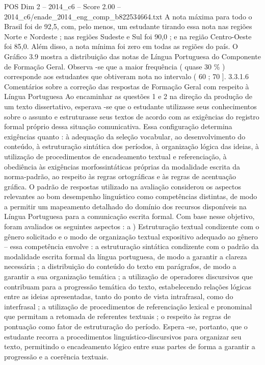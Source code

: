 \begin{textsample}{POS Dim 2 – 2014\_c6 – Score 2.00 – 2014\_c6/enade\_2014\_eng\_comp\_b822534664.txt}
A nota máxima para todo o Brasil foi de 92,5, com, pelo menos, um estudante tirando essa nota nas regiões Norte e Nordeste ; nas regiões Sudeste e Sul foi 90,0 ; e na região Centro-Oeste foi 85,0.
Além disso, a nota mínima foi zero em todas as regiões do país.
O Gráfico 3.9 mostra a distribuição das notas de Língua Portuguesa do Componente de Formação Geral.
Observa -se que a maior frequência ( quase 30 \% ) corresponde aos estudantes que obtiveram nota no intervalo ( 60 ; 70 ]. 3.3.1.6 Comentários sobre a correção das respostas de Formação Geral com respeito à Língua Portuguesa Ao encaminhar as questões 1 e 2 na direção da produção de um texto dissertativo, esperava -se que o estudante utilizasse seus conhecimentos sobre o assunto e estruturasse seus textos de acordo com as exigências do registro formal próprio dessa situação comunicativa.
Essa configuração determina exigências quanto : à adequação da seleção vocabular, ao desenvolvimento do conteúdo, à estruturação sintática dos períodos, à organização lógica das ideias, à utilização de procedimentos de encadeamento textual e referenciação, à obediência às exigências morfossintáticas próprias da modalidade escrita da norma-padrão, ao respeito às regras ortográficas e às regras de acentuação gráfica.
O padrão de respostas utilizado na avaliação considerou os aspectos relevantes ao bom desempenho linguístico como competências distintas, de modo a permitir um mapeamento detalhado do domínio dos recursos disponíveis na Língua Portuguesa para a comunicação escrita formal.
Com base nesse objetivo, foram avaliados os seguintes aspectos : a ) Estruturação textual condizente com o gênero solicitado e o modo de organização textual expositivo adequado ao gênero – essa competência envolve : a estruturação sintática condizente com o padrão da modalidade escrita formal da língua portuguesa, de modo a garantir a clareza necessária ; a distribuição do conteúdo do texto em parágrafos, de modo a garantir a sua organização temática ; a utilização de operadores discursivos que contribuam para a progressão temática do texto, estabelecendo relações lógicas entre as ideias apresentadas, tanto do ponto de vista intrafrasal, como do interfrasal ; a utilização de procedimentos de referenciação lexical e pronominal que permitam a retomada de referentes textuais ; o respeito às regras de pontuação como fator de estruturação do período.
Espera -se, portanto, que o estudante recorra a procedimentos linguístico-discursivos para organizar seu texto, permitindo o encadeamento lógico entre suas partes de forma a garantir a progressão e a coerência textuais.

\end{textsample}
